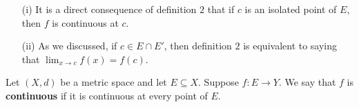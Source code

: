 \documentclass[a4paper]{article}
\begin{document}
\begin{remark}
    \begin{enumerate}
        \item[(i)] It is a direct consequence of definition \( 2  \) that if \( c  \) is an isolated point of \( E  \), then \( f  \) is continuous at \( c  \).
        \item[(ii)] As we discussed, if \( c \in E \cap E' \), then definition \( 2 \) is equivalent to saying that \( \lim_{ x \to c } f(x) = f(c) \).
    \end{enumerate}
\end{remark}

\begin{definition}
   Let \( (X,d)\) be a metric space and let \( E \subseteq X  \). Suppose \( f: E \to Y \). We say that \( f  \) is \textbf{continuous} if it is continuous at every point of \( E  \).
\end{definition}
\end{document}
